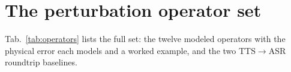\documentclass[11pt]{article}
\begin{document}
\raggedbottom

\appendix

\section{The perturbation operator set}
\label{app:operators}

Tab.~\ref{tab:operators} lists the full set: the twelve modeled operators with the physical
error each models and a worked example, and the two TTS$\to$ASR roundtrip baselines.


\end{document}
